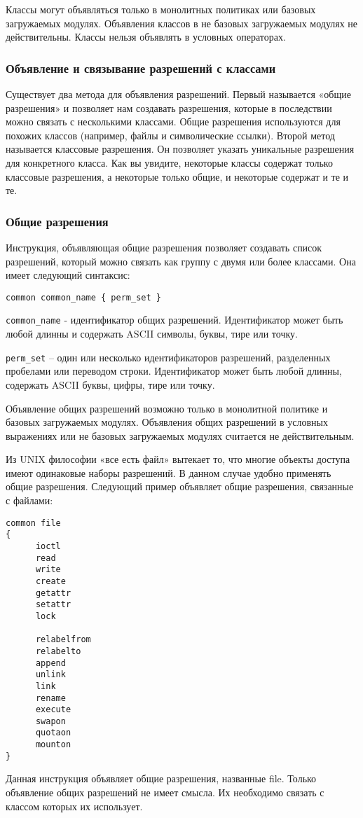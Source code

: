 \documentclass{./../class/UIR}
\begin{document}
    Классы могут объявляться только в монолитных политиках или базовых загружаемых
    модулях. Объявления классов в не базовых загружаемых модулях не действительны.
    Классы нельзя объявлять в условных операторах.

\subsubsection{Объявление и связывание разрешений с классами}

    Существует два метода для объявления разрешений. Первый называется «общие
    разрешения» и позволяет нам создавать разрешения, которые в последствии
    можно связать с несколькими классами. Общие разрешения используются для
    похожих классов (например, файлы и символические ссылки). Второй метод
    называется классовые разрешения. Он позволяет указать уникальные разрешения
    для конкретного класса. Как вы увидите, некоторые классы содержат только
    классовые разрешения, а некоторые только общие, и некоторые содержат и те и
    те.

\subsubsection{Общие разрешения}
    Инструкция, объявляющая общие разрешения позволяет создавать список
    разрешений, который можно связать как группу с двумя или более классами. Она
    имеет следующий синтаксис:
\begin{verbatim}
common common_name { perm_set }
\end{verbatim}
    \verb"common_name" - идентификатор общих разрешений. Идентификатор может
    быть любой длинны и содержать ASCII символы, буквы, тире или точку.

    \verb"perm_set" – один или несколько идентификаторов разрешений, разделенных
    пробелами или переводом строки. Идентификатор может быть любой длинны, содержать ASCII
    буквы, цифры, тире или точку.

    Объявление общих разрешений возможно только в монолитной политике и базовых
    загружаемых модулях. Объявления общих разрешений в условных выражениях или не
    базовых загружаемых модулях считается не действительным.

    Из UNIX философии «все есть файл» вытекает то, что многие объекты доступа имеют
    одинаковые наборы разрешений. В данном случае удобно применять общие разрешения.
    Следующий пример объявляет общие разрешения, связанные с файлами:
\begin{verbatim}
common file
{
      ioctl
      read
      write
      create
      getattr
      setattr
      lock

      relabelfrom
      relabelto
      append
      unlink
      link
      rename
      execute
      swapon
      quotaon
      mounton
}
\end{verbatim}
    Данная инструкция объявляет общие разрешения, названные file. Только объявление
    общих разрешений не имеет смысла. Их необходимо связать с классом которых их
    использует.
\end{document}

